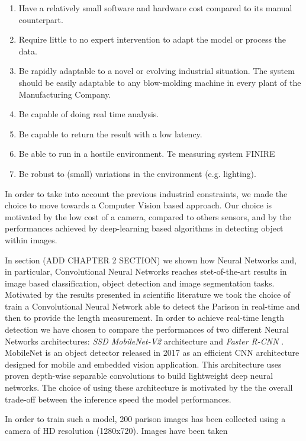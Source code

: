 \begin{enumerate}
    \item Have a relatively small software and hardware cost compared to its manual counterpart.
    \item Require little to no expert intervention to adapt the model or process the data.
    \item Be rapidly adaptable to a novel or evolving industrial situation. The system should be easily adaptable to any blow-molding machine in every plant of the Manufacturing Company.
    \item Be capable of doing real time analysis.
    \item Be capable to return the result with a low latency.
    \item Be able to run in a hostile environment. Te measuring system FINIRE 
    \item Be robust to (small) variations in the environment (e.g. lighting).
\end{enumerate}

In order to take into account the previous industrial constraints, we made the choice to move towards a Computer Vision based approach. Our choice is motivated by the low cost of a camera, compared to others sensors, and by the performances achieved by deep-learning based algorithms in detecting object within images. 

In section (ADD CHAPTER 2 SECTION) we shown how Neural Networks and, in particular, Convolutional Neural Networks reaches stet-of-the-art results in image based classification, object detection and image segmentation tasks. Motivated by the results presented in scientific literature we took the choice of train a Convolutional Neural Network able to detect the Parison in real-time and then to provide the length measurement. In order to achieve real-time length detection we have chosen to compare the performances of two different Neural Networks architectures: \textit{SSD MobileNet-V2} architecture \citep{sandler2018mobilenetv2} and \textit{Faster R-CNN} \citep{ren2015faster}. MobileNet is an object detector released in 2017 as an efficient CNN architecture designed for mobile and embedded vision application. This architecture uses proven depth-wise separable convolutions to build lightweight deep neural networks. The choice of using these architecture is motivated by the the overall trade-off between the inference speed the model performances. 

In order to train such a model, 200 parison images has been collected using a camera of HD resolution (1280x720). Images have been taken 

